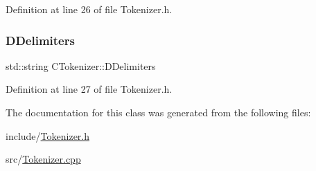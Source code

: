 Definition at line 26 of file Tokenizer.\+h.

\hypertarget{classCTokenizer_ad1edcf297f5f9ccf43dc32a992556f52}{}\label{classCTokenizer_ad1edcf297f5f9ccf43dc32a992556f52} 
\subsubsection{\texorpdfstring{D\+Delimiters}{DDelimiters}}
{\footnotesize\ttfamily std\+::string C\+Tokenizer\+::\+D\+Delimiters\hspace{0.3cm}{\ttfamily [protected]}}



Definition at line 27 of file Tokenizer.\+h.



The documentation for this class was generated from the following files\+:\begin{DoxyCompactItemize}
\item 
include/\hyperlink{Tokenizer_8h}{Tokenizer.\+h}\item 
src/\hyperlink{Tokenizer_8cpp}{Tokenizer.\+cpp}\end{DoxyCompactItemize}
